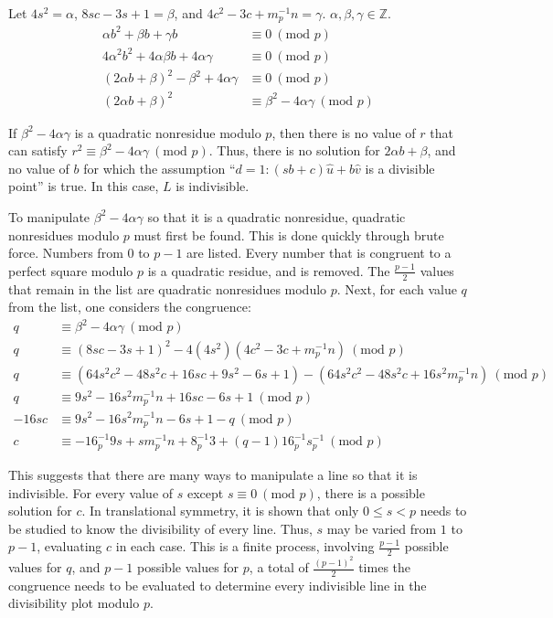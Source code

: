 \documentclass{article}
\begin{document}
Let \(4s^2 = \alpha\), \(8sc - 3s + 1 = \beta\), and \(4c^2 - 3c + m^{-1}_pn = \gamma\). \(\alpha,\beta,\gamma \in \mathbb{Z}\).
\begin{align}
	\nonumber \alpha b^2 + \beta b + \gamma b &\equiv 0\ (\text{mod }p) \\
	\nonumber 4 \alpha^2 b^2 + 4 \alpha \beta b + 4 \alpha \gamma &\equiv 0\ (\text{mod }p) \\
	\nonumber (2 \alpha b + \beta)^2 - \beta^2 + 4 \alpha \gamma &\equiv 0\ (\text{mod }p) \\
	\nonumber (2 \alpha b + \beta)^2 &\equiv \beta^2 - 4 \alpha \gamma\ (\text{mod }p)
\end{align}

If \(\beta^2 - 4 \alpha \gamma\) is a quadratic nonresidue modulo \(p\), then there is no value of \(r\) that can satisfy \(r^2 \equiv \beta^2 - 4 \alpha \gamma\ (\text{mod }p)\). Thus, there is no solution for \(2 \alpha b + \beta\), and no value of \(b\) for which the assumption ``\(d=1:(sb+c)\hat{u}+b\hat{v}\) is a divisible point'' is true. In this case, \(L\) is indivisible.

To manipulate \(\beta^2 - 4 \alpha \gamma\) so that it is a quadratic nonresidue, quadratic nonresidues modulo \(p\) must first be found. This is done quickly through brute force. Numbers from \(0\) to \(p-1\) are listed. Every number that is congruent to a perfect square modulo \(p\) is a quadratic residue, and is removed. The \(\frac{p-1}{2}\) values that remain in the list are quadratic nonresidues modulo \(p\). Next, for each value \(q\) from the list, one considers the congruence:
\begin{align}
	\nonumber q &\equiv \beta^2 - 4 \alpha \gamma\ (\text{mod }p) \\
	\nonumber q &\equiv (8sc - 3s + 1)^2 - 4 (4s^2) (4c^2 - 3c + m^{-1}_pn)\ (\text{mod }p) \\
	\nonumber q &\equiv (64s^2c^2 - 48s^2c + 16sc + 9s^2 - 6s + 1) - (64s^2c^2 - 48s^2c + 16s^2m^{-1}_pn)\ (\text{mod }p) \\
	\nonumber q &\equiv 9s^2 - 16s^2m^{-1}_pn + 16sc - 6s + 1\ (\text{mod }p) \\
	\nonumber -16sc &\equiv 9s^2 - 16s^2m^{-1}_pn - 6s + 1 - q\ (\text{mod }p) \\
	\nonumber c &\equiv -16^{-1}_p9s + sm^{-1}_pn + 8^{-1}_p3 + (q-1)16^{-1}_ps^{-1}_p\ (\text{mod }p)
\end{align}
	
This suggests that there are many ways to manipulate a line so that it is indivisible. For every value of \(s\) except \(s \equiv 0\ (\text{mod }p)\), there is a possible solution for \(c\). In translational symmetry, it is shown that only \(0 \leq s < p\) needs to be studied to know the divisibility of every line. Thus, \(s\) may be varied from \(1\) to \(p-1\), evaluating \(c\) in each case. This is a finite process, involving \(\frac{p-1}{2}\) possible values for \(q\), and \(p-1\) possible values for \(p\), a total of \(\frac{(p-1)^2}{2}\) times the congruence needs to be evaluated to determine every indivisible line in the divisibility plot modulo \(p\).
\end{document}
